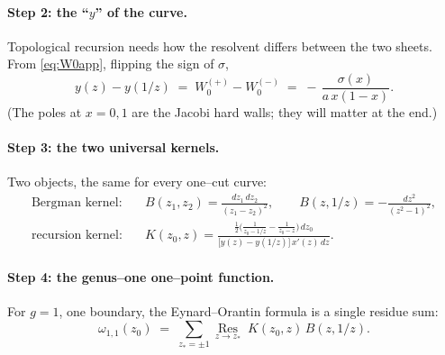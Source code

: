 \documentclass[11pt]{article}
\newif\ifpedagogical
\newcommand{\ped}[1]{\ifpedagogical\par\smallskip{\small\color{pedcol}%
  \leftskip=1.4em\rightskip=1.4em\noindent$\triangleright$~\textit{Plain-language aside.}~#1\par}%
  \par\smallskip\fi}
\begin{document}
\paragraph{Step 2: the ``$y$'' of the curve.}
Topological recursion needs how the resolvent differs between the two sheets. From \eqref{eq:W0app},
flipping the sign of $\sigma$,
\begin{equation}
  y(z)-y(1/z)\;=\;W_0^{(+)}-W_0^{(-)}\;=\;-\,\frac{\sigma(x)}{a\,x(1-x)} .
  \label{eq:ydiff}
\end{equation}
(The poles at $x=0,1$ are the Jacobi hard walls; they will matter at the end.)

\paragraph{Step 3: the two universal kernels.}
Two objects, the same for every one--cut curve:
\begin{align}
  \text{Bergman kernel:}&\quad B(z_1,z_2)=\frac{dz_1\,dz_2}{(z_1-z_2)^2},
  \qquad B(z,1/z)=-\frac{dz^2}{(z^2-1)^2}, \\
  \text{recursion kernel:}&\quad
  K(z_0,z)=\frac{\tfrac12\big(\tfrac{1}{z_0-1/z}-\tfrac{1}{z_0-z}\big)\,dz_0}
  {\big[y(z)-y(1/z)\big]\,x'(z)\,dz}.
\end{align}
\ped{The Bergman kernel is the ``free propagator'' on the curve---it knows nothing but the geometry.
The recursion kernel $K$ is the gadget that carries information from a branch point back out to the
observation point $z_0$, weighted by the inverse of the sheet difference \eqref{eq:ydiff}. Every genus
gets built by sandwiching $B$'s with $K$'s and taking residues.}

\paragraph{Step 4: the genus--one one--point function.}
For $g=1$, one boundary, the Eynard--Orantin formula is a single residue sum:
\begin{equation}
  \omega_{1,1}(z_0)\;=\;\sum_{z_\ast=\pm1}\operatorname*{Res}_{z\to z_\ast}\;K(z_0,z)\,B(z,1/z).
  \label{eq:om11}
\end{equation}
\ped{Read it as: ``take the propagator that connects the two sheets to each other, $B(z,1/z)$; carry it
back to $z_0$ with the kernel $K$; sum the residues at the two branch points.'' That combination is,
by definition, the genus--one correction. ``One--point'' $=$ one observation point $z_0$, which
becomes the single argument $x$ of $W_1$.}
\end{document}
